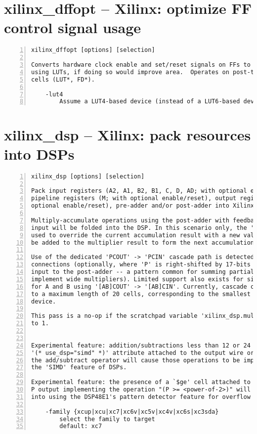 \section{xilinx\_dffopt -- Xilinx: optimize FF control signal usage}
\label{cmd:xilinx_dffopt}
\begin{lstlisting}[numbers=left,frame=single]
    xilinx_dffopt [options] [selection]

Converts hardware clock enable and set/reset signals on FFs to emulation
using LUTs, if doing so would improve area.  Operates on post-techmap Xilinx
cells (LUT*, FD*).

    -lut4
        Assume a LUT4-based device (instead of a LUT6-based device).
\end{lstlisting}

\section{xilinx\_dsp -- Xilinx: pack resources into DSPs}
\label{cmd:xilinx_dsp}
\begin{lstlisting}[numbers=left,frame=single]
    xilinx_dsp [options] [selection]

Pack input registers (A2, A1, B2, B1, C, D, AD; with optional enable/reset),
pipeline registers (M; with optional enable/reset), output registers (P; with
optional enable/reset), pre-adder and/or post-adder into Xilinx DSP resources.

Multiply-accumulate operations using the post-adder with feedback on the 'C'
input will be folded into the DSP. In this scenario only, the 'C' input can be
used to override the current accumulation result with a new value, which will
be added to the multiplier result to form the next accumulation result.

Use of the dedicated 'PCOUT' -> 'PCIN' cascade path is detected for 'P' -> 'C'
connections (optionally, where 'P' is right-shifted by 17-bits and used as an
input to the post-adder -- a pattern common for summing partial products to
implement wide multipliers). Limited support also exists for similar cascading
for A and B using '[AB]COUT' -> '[AB]CIN'. Currently, cascade chains are limited
to a maximum length of 20 cells, corresponding to the smallest Xilinx 7 Series
device.

This pass is a no-op if the scratchpad variable 'xilinx_dsp.multonly' is set
to 1.


Experimental feature: addition/subtractions less than 12 or 24 bits with the
'(* use_dsp="simd" *)' attribute attached to the output wire or attached to
the add/subtract operator will cause those operations to be implemented using
the 'SIMD' feature of DSPs.

Experimental feature: the presence of a `$ge' cell attached to the registered
P output implementing the operation "(P >= <power-of-2>)" will be transformed
into using the DSP48E1's pattern detector feature for overflow detection.

    -family {xcup|xcu|xc7|xc6v|xc5v|xc4v|xc6s|xc3sda}
        select the family to target
        default: xc7
\end{lstlisting}

